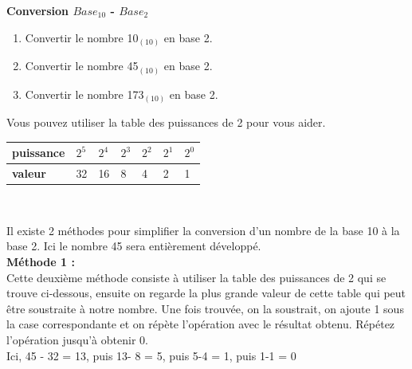 \begin{Exercice}[5 minutes]  \textbf{Conversion $Base_{10}$ - $Base_2$}\\
    \begin{enumerate}
        \item Convertir le nombre 10$_{(10)}$ en base 2.
        \item Convertir le nombre 45$_{(10)}$ en base 2.
        \item Convertir le nombre 173$_{(10)}$ en base 2.
    \end{enumerate}

    \begin{conseil}
        Vous pouvez utiliser la table des puissances de 2 pour vous aider. \\
        
        \begin{tabular}{| C{0.1\textwidth} | C{0.1\textwidth} | C{0.1\textwidth} | C{0.1\textwidth} | C{0.1\textwidth} | C{0.1\textwidth} | C{0.1\textwidth} |} 
            \hline
            \textbf{puissance} & $2^{5}$ & $2^{4}$ & $2^{3}$ & $2^{2}$ & $2^{1}$ & $2^{0}$ \\ [0.5ex] 
            \hline
            \textbf{valeur} & 32 & 16 & 8 & 4 & 2 & 1 \\ [0.5ex] 
            \hline
        \end{tabular} \\
        
    \end{conseil}

    \begin{solution}
        Il existe 2 méthodes pour simplifier la conversion d'un nombre de la base 10 à la base 2. Ici le nombre 45 sera entièrement développé. \\
        
        
        \textbf{Méthode 1 :} \\
        
        Cette deuxième méthode consiste à utiliser la table des puissances de 2 qui se trouve ci-dessous, ensuite on regarde la plus grande valeur de cette table qui peut être soustraite à notre nombre. Une fois trouvée, on la soustrait, on ajoute 1 sous la case correspondante et on répète l'opération avec le résultat obtenu. Répétez l'opération jusqu'à obtenir 0.\\
        
Ici, 45 - 32 = 13, puis 13- 8 = 5, puis 5-4 = 1, puis 1-1 = 0 \\
        

\end{solution}
\end{Exercice}
